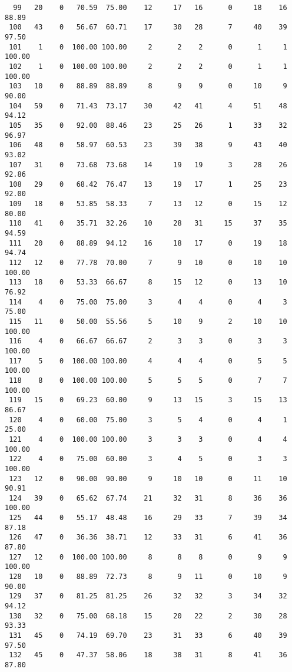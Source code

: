 \begin{verbatim}
  99   20    0   70.59  75.00    12     17   16      0     18    16    88.89
 100   43    0   56.67  60.71    17     30   28      7     40    39    97.50
 101    1    0  100.00 100.00     2      2    2      0      1     1   100.00
 102    1    0  100.00 100.00     2      2    2      0      1     1   100.00
 103   10    0   88.89  88.89     8      9    9      0     10     9    90.00
 104   59    0   71.43  73.17    30     42   41      4     51    48    94.12
 105   35    0   92.00  88.46    23     25   26      1     33    32    96.97
 106   48    0   58.97  60.53    23     39   38      9     43    40    93.02
 107   31    0   73.68  73.68    14     19   19      3     28    26    92.86
 108   29    0   68.42  76.47    13     19   17      1     25    23    92.00
 109   18    0   53.85  58.33     7     13   12      0     15    12    80.00
 110   41    0   35.71  32.26    10     28   31     15     37    35    94.59
 111   20    0   88.89  94.12    16     18   17      0     19    18    94.74
 112   12    0   77.78  70.00     7      9   10      0     10    10   100.00
 113   18    0   53.33  66.67     8     15   12      0     13    10    76.92
 114    4    0   75.00  75.00     3      4    4      0      4     3    75.00
 115   11    0   50.00  55.56     5     10    9      2     10    10   100.00
 116    4    0   66.67  66.67     2      3    3      0      3     3   100.00
 117    5    0  100.00 100.00     4      4    4      0      5     5   100.00
 118    8    0  100.00 100.00     5      5    5      0      7     7   100.00
 119   15    0   69.23  60.00     9     13   15      3     15    13    86.67
 120    4    0   60.00  75.00     3      5    4      0      4     1    25.00
 121    4    0  100.00 100.00     3      3    3      0      4     4   100.00
 122    4    0   75.00  60.00     3      4    5      0      3     3   100.00
 123   12    0   90.00  90.00     9     10   10      0     11    10    90.91
 124   39    0   65.62  67.74    21     32   31      8     36    36   100.00
 125   44    0   55.17  48.48    16     29   33      7     39    34    87.18
 126   47    0   36.36  38.71    12     33   31      6     41    36    87.80
 127   12    0  100.00 100.00     8      8    8      0      9     9   100.00
 128   10    0   88.89  72.73     8      9   11      0     10     9    90.00
 129   37    0   81.25  81.25    26     32   32      3     34    32    94.12
 130   32    0   75.00  68.18    15     20   22      2     30    28    93.33
 131   45    0   74.19  69.70    23     31   33      6     40    39    97.50
 132   45    0   47.37  58.06    18     38   31      8     41    36    87.80

\end{verbatim}
